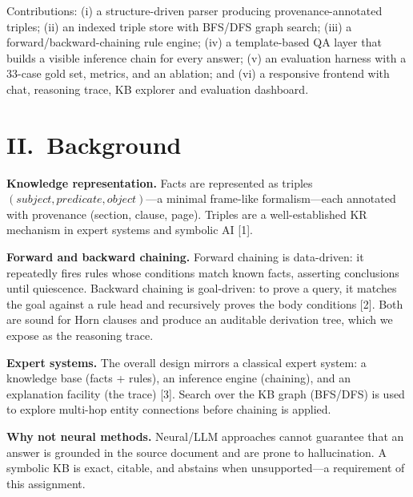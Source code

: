 \documentclass[10pt,twocolumn]{article}
\begin{document}
Contributions: (i) a structure-driven parser producing provenance-annotated
triples; (ii) an indexed triple store with BFS/DFS graph search; (iii) a
forward/backward-chaining rule engine; (iv) a template-based QA layer that builds
a visible inference chain for every answer; (v) an evaluation harness with a
33-case gold set, metrics, and an ablation; and (vi) a responsive frontend with
chat, reasoning trace, KB explorer and evaluation dashboard.

\section*{II.~Background}
\textbf{Knowledge representation.} Facts are represented as triples
$(subject, predicate, object)$---a minimal frame-like formalism---each annotated
with provenance (section, clause, page). Triples are a well-established KR
mechanism in expert systems and symbolic AI [1].

\textbf{Forward and backward chaining.} Forward chaining is data-driven: it
repeatedly fires rules whose conditions match known facts, asserting conclusions
until quiescence. Backward chaining is goal-driven: to prove a query, it matches
the goal against a rule head and recursively proves the body conditions [2].
Both are sound for Horn clauses and produce an auditable derivation tree, which
we expose as the reasoning trace.

\textbf{Expert systems.} The overall design mirrors a classical expert system: a
knowledge base (facts + rules), an inference engine (chaining), and an
explanation facility (the trace) [3]. Search over the KB graph (BFS/DFS) is used
to explore multi-hop entity connections before chaining is applied.

\textbf{Why not neural methods.} Neural/LLM approaches cannot guarantee that an
answer is grounded in the source document and are prone to hallucination. A
symbolic KB is exact, citable, and abstains when unsupported---a requirement of
this assignment.
\end{document}
